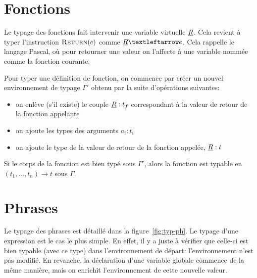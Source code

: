\begin{mathpar}

\end{mathpar}

\section{Fonctions}

Le typage des fonctions fait intervenir une variable virtuelle $\vRet$. Cela
revient à typer l'instruction $\iReturn{e}$ comme $\vRet ← e$. Cela rappelle le
langage Pascal, où pour retourner une valeur on l'affecte à une variable nommée
comme la fonction courante.

\begin{mathpar}
\end{mathpar}

Pour typer une définition de fonction, on commence par créer un nouvel
environnement de typage $Γ'$ obtenu par la suite d'opérations suivantes:

\begin{itemize}
\item
  on enlève (s'il existe) le couple $\vRet : t_f$ correspondant à la
  valeur de retour de la fonction appelante
\item
  on ajoute les types des arguments $a_i : t_i$
\item
  on ajoute le type de la valeur de retour de la fonction appelée,
  $\vRet : t$
\end{itemize}

Si le corps de la fonction est bien typé sous $Γ'$, alors la fonction est
typable en $(t_1, …, t_n) → t$ sous $Γ$.

\begin{mathpar}
\end{mathpar}

\section{Phrases}

Le typage des phrases est détaillé dans la figure~\ref{fig:typ-ph}. Le typage
d'une expression est le cas le plus simple. En effet, il y a juste à vérifier
que celle-ci est bien typable (avec ce type) dans l'environnement de départ:
l'environnement n'est pas modifié. En revanche, la déclaration d'une variable
globale commence de la même manière, mais on enrichit l'environnement de cette
nouvelle valeur.

